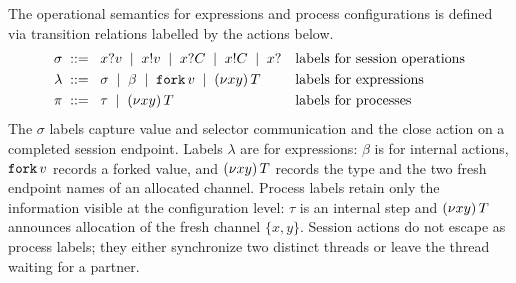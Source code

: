 %
%

The operational semantics for expressions and process configurations is
defined via transition relations labelled by the actions below.
%
\begin{align*}
  \sigma &\; ::= \;\; {x}?{v}
	   \;\mid\; {x}!{v}
       \;\mid\; {x}?{C}
	   \;\mid\; {x}!{C}
       \;\mid\; {x?}
       && \text{labels for session operations}
  \\
  \lambda &\; ::= \;\; \sigma
       \;\mid\; \beta
       \;\mid\; \texttt{fork}\,{v}
	   \;\mid\; (\nu{x}{y})\,{T}
       && \text{labels for expressions}
  \\
  \pi &\; ::= \;\; \tau
  \;\mid\; (\nu{x}{y})\,{T}
       && \text{labels for processes}
\end{align*}
%
The $\sigma$ labels capture value and selector communication and the close
action on a completed session endpoint.
%
Labels $\lambda$ are for expressions: $\beta$ is for internal actions,
$\texttt{fork}\,{v}$ records a forked value, and $(\nu{x}{y})\,{T}$ records the type and the two
fresh endpoint names of an allocated channel.
%
Process labels retain only the information visible at the configuration
level: $\tau$ is an internal step and $(\nu{x}{y})\,{T}$ announces allocation of the
fresh channel $\{x,y\}$.  Session actions do not escape as process labels; they
either synchronize two distinct threads or leave the thread waiting for a
partner.

